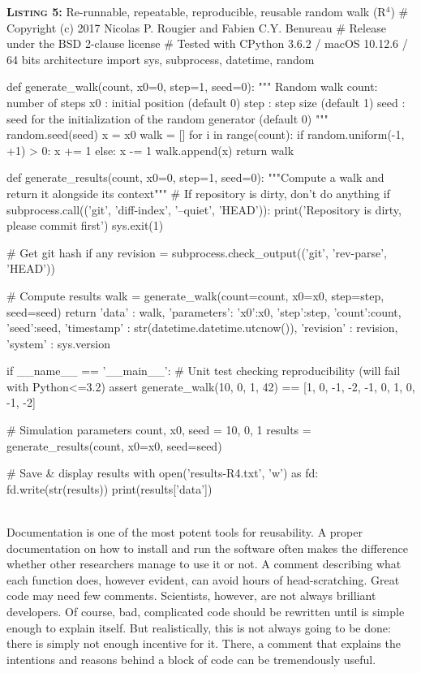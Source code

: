 \documentclass[a4paper,11pt]{article}
\begin{document}
\noindent \begin{minipage}[c]{\linewidth}
\begin{code}{\textbf{\textsc{Listing 5:}} Re-runnable, repeatable, reproducible, reusable random walk (R$^4$)}
# Copyright (c) 2017 Nicolas P. Rougier and Fabien C.Y. Benureau
# Release under the BSD 2-clause license
# Tested with CPython 3.6.2 / macOS 10.12.6 / 64 bits architecture
import sys, subprocess, datetime, random

def generate_walk(count, x0=0, step=1, seed=0):
    """ Random walk
        count: number of steps
        x0   : initial position (default 0)
        step : step size (default 1)
        seed : seed for the initialization of the random generator (default 0)
    """
    random.seed(seed)
    x = x0
    walk = []
    for i in range(count):
        if random.uniform(-1, +1) > 0:
            x += 1
        else:
            x -= 1
        walk.append(x)
    return walk

def generate_results(count, x0=0, step=1, seed=0):
    """Compute a walk and return it alongside its context"""
    # If repository is dirty, don't do anything
    if subprocess.call(('git', 'diff-index', '--quiet', 'HEAD')):
        print('Repository is dirty, please commit first')
        sys.exit(1)

    # Get git hash if any
    revision = subprocess.check_output(('git', 'rev-parse', 'HEAD'))

    # Compute results
    walk = generate_walk(count=count, x0=x0, step=step, seed=seed)
    return {'data'      : walk,
            'parameters': {'x0':x0, 'step':step, 'count':count, 'seed':seed},
            'timestamp' : str(datetime.datetime.utcnow()),
            'revision'  : revision,
            'system'    : sys.version}

if __name__ == '__main__':
    # Unit test checking reproducibility (will fail with Python<=3.2)
    assert generate_walk(10, 0, 1, 42) == [1, 0, -1, -2, -1, 0, 1, 0, -1, -2]

    # Simulation parameters
    count, x0, seed = 10, 0, 1
    results = generate_results(count, x0=x0, seed=seed)

    # Save & display results
    with open('results-R4.txt', 'w') as fd:
        fd.write(str(results))
    print(results['data'])
\end{code}
\end{minipage}\\


Documentation is one of the most potent tools for reusability. A proper documentation on how to install and run the software often makes the difference whether other researchers manage to use it or not. A comment describing what each function does, however evident, can avoid hours of head-scratching. Great code may need few comments. Scientists, however, are not always brilliant developers. Of course, bad, complicated code should be rewritten until is simple enough to explain itself. But realistically, this is not always going to be done: there is simply not enough incentive for it. There, a comment that explains the intentions and reasons behind a block of code can be tremendously useful.\\
\end{document}
